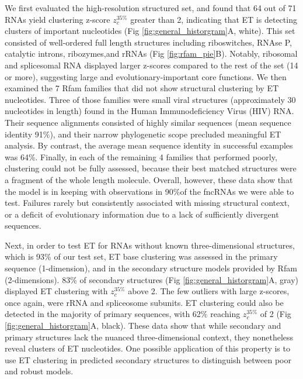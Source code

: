 \documentclass[12pt,a4paper]{report}
\begin{document}
We first evaluated the high-resolution structured set, and found that 64 out of 71 RNAs yield clustering z-score $z_{c}^{35\%}$ greater than 2, indicating that ET is detecting clusters of important nucleotides (Fig \ref{fig:general_historgram}A, white). This set consisted of well-ordered full length structures including riboswitches, RNAse P, catalytic introns, ribozymes,and  rRNAs (Fig \ref{fig:rfam_pie}B). Notably, ribosomal and splicesomal RNA displayed larger z-scores compared to the rest of the set (14 or more), suggesting large and evolutionary-important core functions. We then examined the 7 Rfam families that did not show structural clustering by ET nucleotides. Three of those families were small viral structures (approximately 30 nucleotides in length) found in the Human Immunodeficiency Virus (HIV) RNA. Their sequence alignments consisted of highly similar sequences (mean sequence identity 91\%), and their narrow phylogenetic scope precluded meaningful ET analysis. By contrast, the average mean sequence identity in successful examples was 64\%. Finally, in each of the remaining 4 families that performed poorly, clustering could not be fully assessed, because their best matched structures were a fragment of the whole length molecule. Overall, however, these data show that the model is in keeping with observations in 90\%of the fncRNAs we were able to test. Failures rarely but consistently associated with missing structural context, or a deficit of evolutionary information due to a lack of sufficiently divergent sequences.

Next, in order to test ET for RNAs without known three-dimensional structures, which is 93\% of our test set, ET base clustering was assessed in the primary sequence (1-dimension), and in the secondary structure models provided by Rfam (2-dimensions). 83\% of secondary structures (Fig \ref{fig:general_historgram}A, gray) displayed ET clustering with $z_{c}^{35\%}$ above 2. The few outliers with large z-scores, once again, were rRNA and spliceosome subunits. ET clustering could also be detected in the majority of primary sequences, with 62\% reaching $z_{c}^{35\%}$ of 2 (Fig \ref{fig:general_historgram}A, black). These data show that while secondary and primary structures lack the nuanced three-dimensional context, they nonetheless reveal clusters of ET nucleotides. One possible application of this property is to use ET clustering in predicted secondary structures to distinguish between poor and robust models. 
\end{document}
